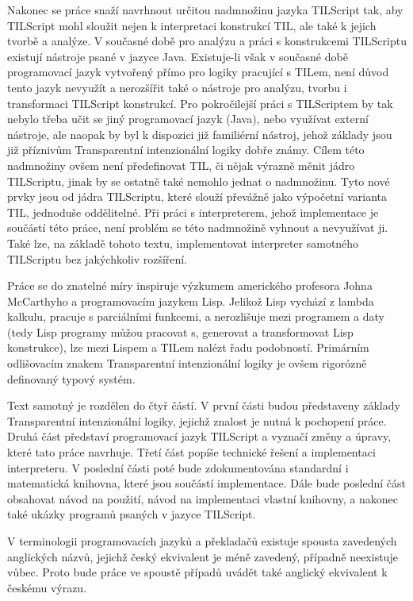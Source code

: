 Nakonec se práce snaží navrhnout určitou nadmnožinu jazyka TILScript tak, aby TILScript mohl
sloužit nejen k interpretaci konstrukcí TIL, ale také k jejich tvorbě a analýze. V současné době
pro analýzu a práci s konstrukcemi TILScriptu existují nástroje psané v jazyce Java. Existuje-li
však v současné době programovací jazyk vytvořený přímo pro logiky pracující s TILem, není důvod
tento jazyk nevyužít a nerozšířit také o nástroje pro analýzu, tvorbu i transformaci TILScript
konstrukcí. Pro pokročilejší práci s TILScriptem by tak nebylo třeba učit se jiný programovací
jazyk (Java), nebo využívat externí nástroje, ale naopak by byl k dispozici již familiérní nástroj,
jehož základy jsou již příznivům Transparentní intenzionální logiky dobře známy. Cílem této
nadmnožiny ovšem není předefinovat TIL, či nějak výrazně měnit jádro TILScriptu, jinak by se
ostatně také nemohlo jednat o nadmnožinu. Tyto nové prvky jsou od jádra TILScriptu, které slouží
převážně jako výpočetní varianta TIL, jednoduše oddělitelné. Při práci s interpreterem, jehož
implementace je součástí této práce, není problém se této nadmnožině vyhnout a nevyužívat ji.
Také lze, na základě tohoto textu, implementovat interpreter samotného TILScriptu bez jakýchkoliv
rozšíření.

Práce se do znatelné míry inspiruje výzkumem amerického profesora Johna McCarthyho a programovacím
jazykem Lisp. Jelikož Lisp vychází z lambda kalkulu, pracuje s parciálními funkcemi, a nerozlišuje
mezi programem a daty (tedy Lisp programy můžou pracovat s, generovat a transformovat Lisp
konstrukce), lze mezi Lispem a TILem nalézt řadu podobností. Primárním odlišovacím znakem
Transparentní intenzionální logiky je ovšem rigorózně definovaný typový systém.

Text samotný je rozdělen do čtyř částí. V první části budou představeny základy Transparentní
intenzionální logiky, jejichž znalost je nutná k pochopení práce. Druhá část představí programovací
jazyk TILScript a vyznačí změny a úpravy, které tato práce navrhuje. Třetí část popíše technické
řešení a implementaci interpreteru. V poslední části poté bude zdokumentována standardní i
matematická knihovna, které jsou součástí implementace. Dále bude poslední část obsahovat návod
na použití, návod na implementaci vlastní knihovny, a nakonec také ukázky programů psaných v jazyce
TILScript.

V terminologii programovacích jazyků a překladačů existuje spousta zavedených anglických názvů,
jejichž český ekvivalent je méně zavedený, případně neexistuje vůbec. Proto bude práce ve spoustě
případů uvádět také anglický ekvivalent k českému výrazu.

\endinput
